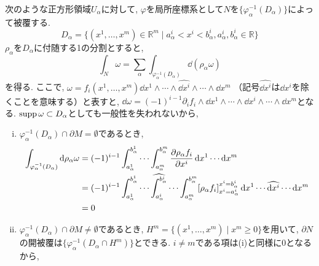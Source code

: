 \documentclass[../main.tex]{subfiles}
\begin{document}
        \begin{prf}{}{}
            次のような正方形領域$U_\alpha$に対して, $\varphi$を局所座標系として$N$を$\{\varphi_\alpha^{-1}(D_\alpha)\}$によって被覆する.
            \begin{equation*}
                D_\alpha = \{(x^1,\ldots,x^m)\in\mathbb{R}^m \mid a_\alpha^i<x^i<b_\alpha^i,a_\alpha^i,b_\alpha^i\in\mathbb{R}\}
            \end{equation*}
            $\rho_\alpha$を$D_\alpha$に付随する1の分割とすると,
            \begin{equation*}
                \int_N \omega = \sum_\alpha \int_{\varphi_\alpha^{-1}(D_\alpha)} \dd(\rho_\alpha \omega)
            \end{equation*}
            を得る.
            ここで, $\omega = f_i(x^1,\ldots,x^m) \dd{x^1}\wedge\cdots\wedge\widehat{\dd{x^i}}\wedge\cdots\wedge\dd{x^m}$
            （記号$\widehat{\dd{x^i}}$は$\dd{x^i}$を除くことを意味する）と表すと,
            $\dd{\omega} = (-1)^{i-1} \partial_if_i \wedge\dd{x^1}\wedge\cdots\wedge\dd{x^i}\wedge\cdots\wedge\dd{x^m}$となる.
            $\operatorname{supp}{\omega} \subset D_\alpha$としても一般性を失われないから,
            \begin{enumerate}[(i)]
                \item $\varphi_\alpha^{-1}(D_\alpha) \cap \partial M = \emptyset$であるとき,
                        \begin{align*}
                            \int_{\varphi_\alpha^{-1}(D_\alpha)} \dd{\rho_\alpha \omega}
                                &= (-1)^{i-1}\int_{a_\alpha^1}^{b_\alpha^1}\cdots\int_{a_\alpha^m}^{b_\alpha^m}
                                        \pdv{\rho_\alpha f_i}{x^i} \dd{x^1}\cdots\dd{x^m} \\
                                &= (-1)^{i-1}\int_{a_\alpha^1}^{b_\alpha^1}\cdots\widehat{\int_{a_\alpha^i}^{b_\alpha^i}}\cdots\int_{a_\alpha^m}^{b_\alpha^m}
                                        [\rho_\alpha f_i]_{x^i=a_\alpha^i}^{x^i=b_\alpha^i} \dd{x^1}\cdots\widehat{\dd{x^i}}\cdots\dd{x^m} \\
                                &= 0
                        \end{align*}
                \item $\varphi_\alpha^{-1}(D_\alpha) \cap \partial M \ne \emptyset$であるとき, $H^m=\{(x^1,\ldots,x^m) \mid x^m\ge0\}$を用いて,
                        $\partial N$の開被覆は$\{\varphi_\alpha^{-1}(D_\alpha \cap H^m)\}$とできる.
                        $i\ne m$である項は(i)と同様に$0$となるから,

\end{enumerate}
\end{prf}
\end{document}
